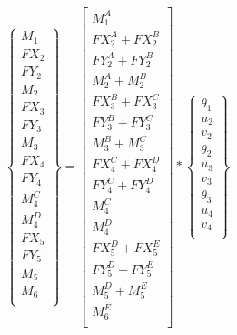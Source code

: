 \documentclass[a4paper]{article}
\begin{document}
{
\renewcommand{\arraystretch}{1.3}
\begin{equation}
    \begin{Bmatrix}
        M_1\\
        FX_2\\
        FY_2\\
        M_2\\
        FX_3\\
        FY_3\\
        M_3\\
        FX_4\\
        FY_4\\
        M_4^C\\
        M_4^D\\
        FX_5\\
        FY_5\\
        M_5\\
        M_6\\
    \end{Bmatrix} 
= 
    \left[\begin{matrix}
        M_1^A\\
        FX_2^A+FX_2^B\\
        FY_2^A+FY_2^B\\
        M_2^A+M_2^B\\
        FX_3^B+FX_3^C\\
        FY_3^B+FY_3^C\\
        M_3^B+M_3^C\\
        FX_4^C+FX_4^D\\
        FY_4^C+FY_4^D\\
        M_4^C\\
        M_4^D\\
        FX_5^D+FX_5^E\\
        FY_5^D+FY_5^E\\
        M_5^D+M_5^E\\
        M_6^E\\
    \end{matrix}\right] * 
    \begin{Bmatrix}
        \theta_1\\
        u_2\\
        v_2\\
        \theta_2\\
        u_3\\
        v_3\\
        \theta_3\\
        u_4\\
        v_4\\

\end{Bmatrix}
\end{equation}}
\end{document}
